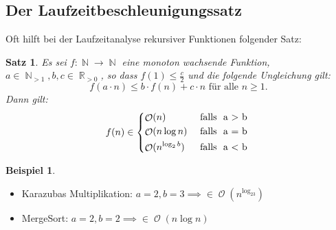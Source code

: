 \documentclass[a4paper,12pt]{article}
\DeclareMathOperator{\N}{\mathbb N}
\DeclareMathOperator{\R}{\mathbb R}
\DeclareMathOperator{\BigO}{\mathcal O}
\newtheorem{satz}[axiom]{Satz}
\theoremstyle{definition}
\newtheorem*{example}{Beispiel}
\begin{document}
	\setcounter{section}{8}
	\setcounter{subsection}{5}
	\subsection{Der Laufzeitbeschleunigungssatz}
	Oft hilft bei der Laufzeitanalyse rekursiver Funktionen folgender Satz:
	\begin{satz}
		Es sei $f: \N \to \N$ eine monoton wachsende Funktion, $a \in \N_{>1}, b, c \in \R_{> 0}$, so dass $f(1) \leq \frac{c}{2}$ und die folgende Ungleichung gilt:
		\[
			f(a \cdot n) \leq b \cdot f(n) + c\cdot n \text{ für alle } n \geq 1.
		\]
		Dann gilt:
		\[
			f(n) \in
			\begin{dcases*}
				\BigO(n) &\text{ falls } a > b\\
				\BigO(n \log n) &\text{ falls } a = b\\
				\BigO(n^{\log_2b}) &\text{ falls } a < b
			\end{dcases*}
		\]
	\end{satz}
	\begin{example}
		\begin{itemize}
			\item Karazubas Multiplikation: $a = 2, b = 3 \implies \in \BigO(n^{\log_23})$
			\item MergeSort: $a = 2, b = 2 \implies \in \BigO(n \log n)$ 
		\end{itemize}
	\end{example}
\end{document}
